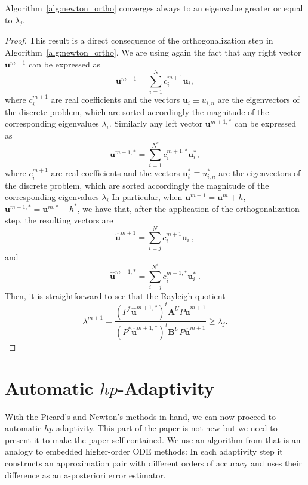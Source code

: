 \documentclass[smallextended]{svjour3}
\begin{document}
\begin{theorem}
Algorithm~\ref{alg:newton_ortho} converges always to an eigenvalue greater or equal to $\lambda_j$.
\end{theorem}

\begin{proof}
This result is a direct consequence of the orthogonalization step in Algorithm~\ref{alg:newton_ortho}.
We are using again the fact that any right vector $\mathbf{u}^{m+1}$ can be expressed as 
$$
\mathbf{u}^{m+1}=\sum_{i=1}^N c_i^{m+1} \mathbf{u}_i,
$$
where $c_i^{m+1}$ are real coefficients  and the vectors $\mathbf{u}_i\equiv u_{i,n}$ are the eigenvectors of the discrete problem, which are sorted accordingly the magnitude of the corresponding eigenvalues $\lambda_i$.
Similarly any left vector $\mathbf{u}^{m+1,*}$ can be expressed as 
$$
\mathbf{u}^{m+1,*}=\sum_{i=1}^{N^*} c_i^{m+1,*} \mathbf{u}_i^*,
$$
where $c_i^{m+1}$ are real coefficients and the vectors $\mathbf{u}_i^*\equiv u_{i,n}^*$ are the eigenvectors of the discrete problem, which are sorted accordingly the magnitude of the corresponding eigenvalues $\lambda_i$
In particular, when $\mathbf{u}^{m+1}=\mathbf{u}^m+h$, $\mathbf{u}^{m+1,*}=\mathbf{u}^{m,*}+h^*$, we have that, after the application of the orthogonalization step, the resulting vectors are
$$
\mathbf{\hat u}^{m+1}=\sum_{i=j}^N c_i^{m+1} \mathbf{u}_i\ ,
$$
and 
$$
\mathbf{\hat u}^{m+1,*}=\sum_{i=j}^{N^*} c_i^{m+1,*} \mathbf{u}_i^* \ .
$$
Then, it is straightforward to see that the Rayleigh quotient
$$
\displaystyle\lambda^{m+1}=\frac{(P^*\mathbf{\hat u}^{m+1,*})^t\mathbf{A}^U P\mathbf{\hat u}^{m+1}}{(P^*\mathbf{\hat u}^{m+1,*})^t\mathbf{B}^U P\mathbf{\hat u}^{m+1}} \ge \lambda_j.
$$
\end{proof}



\section{Automatic $hp$-Adaptivity}\label{sec:adapt}


With the Picard's and Newton's methods in hand, we can now proceed to automatic $hp$-adaptivity.
This part of the paper is not new but we need to present it to make the paper self-contained.
We use an algorithm from \cite{solin3} that is an analogy to embedded higher-order ODE methods: 
In each adaptivity step it 
constructs an approximation pair with different orders of accuracy and uses their difference 
as an a-posteriori error estimator. 
\end{document}
